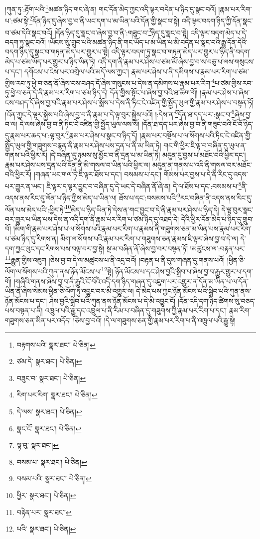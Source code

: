 །ཀུན་ཏུ་:རྟོག་པའི་\footnote{བརྟགས་པའི་  སྣར་ཐང་།  པེ་ཅིན། }མཚན་ཉིད་གང་ཞེ་ན། གང་དོན་མེད་ཀྱང་འདི་ལྟར་བདེན་པ་ཉིད་དུ་སྣང་བའོ། །རྣམ་པར་རིག་པ་:ཙམ་སྟེ་\footnote{ཙམ་དེ་  སྣར་ཐང་།  པེ་ཅིན། }དོན་ཉིད་དུ་ཞེས་བྱ་བ་ནི་ཡང་དག་པ་མ་ཡིན་པའི་དོན་གྱི་སྣང་བ་སྟེ། འདི་ལྟར་བདག་ཉིད་ཀྱི་དོན་སྣང་བ་ཙམ་དེའི་སྣང་བའོ། །དོན་ཉིད་དུ་སྣང་བ་ཞེས་བྱ་བ་ནི་:གཟུང་བ་\footnote{བཟུང་བ་  སྣར་ཐང་།  པེ་ཅིན། }ཉིད་དུ་སྣང་བ་སྟེ། འདི་ལྟར་བདག་མེད་པ་དེ་བདག་ཏུ་སྣང་བའོ། །ཡོངས་སུ་གྲུབ་པའི་མཚན་ཉིད་ནི་གང་ཡོད་པ་མ་ཡིན་པ་མི་བདེན་པ་སྣང་བའི་རྒྱུ་དོན་དེའི་བདག་ཉིད་དུ་སྣང་བ་གཏན་མེད་པར་གྱུར་པ་སྟེ། འདི་ལྟར་བདག་ཏུ་སྣང་བ་གཏན་མེད་པར་གྱུར་པ་ཉིད་ནི་བདག་མེད་པ་ཙམ་ཡོད་པར་གྱུར་པ་ཉིད་ཡིན་ཏེ། འདི་དག་ནི་རྣམ་པར་ཤེས་པ་ཙམ་མོ་ཞེས་བྱ་བ་ས་བཅུ་པ་ལས་གསུངས་པ་དང་། དགོངས་པ་ངེས་པར་འགྲེལ་པའི་མདོ་ལས་ཀྱང་། རྣམ་པར་ཤེས་པ་ནི་དམིགས་པ་རྣམ་པར་རིག་པ་ཙམ་གྱིས་རབ་ཏུ་ཕྱེ་བ་ཅན་ནོ་ཞེས་ངས་བཤད་དོ་ཞེས་གསུངས་པ་དེས་ན་དམིགས་པ་རྣམ་པར་རིག་\footnote{རིག་པར་རིག་  སྣར་ཐང་།  པེ་ཅིན། }པ་ཙམ་གྱིས་རབ་ཏུ་ཕྱེ་བ་ཅན་དེ་ནི་རྣམ་པར་རིག་པ་ཙམ་ཉིད་དེ། དོན་གྱིས་སྟོང་པ་ཞེས་བྱ་བའི་ཐ་ཚིག་གོ། །རྣམ་པར་ཤེས་པ་ཞེས་ངས་བཤད་དོ་ཞེས་བྱ་བའི་རྣམ་པར་ཤེས་པ་སྨོས་པ་དེས་ནི་ཏིང་ངེ་འཛིན་གྱི་སྤྱོད་ཡུལ་གྱི་རྣམ་པར་ཤེས་པ་བསྟན་ཏོ། །འོན་ཀྱང་དེ་ལྟར་སྐྱེས་པའི་ཞེས་བྱ་བ་ནི་རྣམ་པ་དེ་ལྟ་བུར་སྐྱེས་པའོ། །:དེས་ན་\footnote{དེ་ལས་  སྣར་ཐང་།  པེ་ཅིན། }དོན་ཐ་དད་པར་:སྣང་བ་\footnote{སྣང་ངོ་  སྣར་ཐང་།  པེ་ཅིན། }ཞེས་བྱ་བ་ལ། དེ་ལས་ཞེས་བྱ་བ་ནི་ཏིང་ངེ་འཛིན་གྱི་སྤྱོད་ཡུལ་ལས་སོ། །དོན་ཐ་དད་པར་ཞེས་བྱ་བ་ནི་གཟུང་བའི་ངོ་བོ་ཉིད་དུ་རྣམ་པར་ཆད་པ་:ལྟ་བུར་\footnote{ལྟ་བུ་  སྣར་ཐང་། }རྣམ་པར་ཤེས་པ་སྣང་བ་ཉིད་དོ། །རྣམ་པར་བསྔོས་པ་ལ་སོགས་པའི་ཏིང་ངེ་འཛིན་གྱི་སྤྱོད་ཡུལ་གྱི་གཟུགས་བརྙན་ནི་རྣམ་པར་ཤེས་པས་དྲན་པ་ནི་མ་ཡིན་ཏེ། གང་གི་ཕྱིར་ཇི་ལྟ་བ་བཞིན་དུ་ཡུལ་ན་གནས་པའི་ཕྱིར་རོ། །དེ་བཞིན་དུ་ཉམས་སུ་མྱོང་བ་ནི་དྲན་པ་མ་ཡིན་ཏེ། མདུན་དུ་བྱས་པ་མཐོང་བའི་ཕྱིར་དང་། རྣམ་པར་ཤེས་པས་དྲན་པའི་དོན་ནི་མི་གསལ་བ་ཡིན་པའི་ཕྱིར་ལ། མདུན་ན་གནས་པ་འདི་ནི་གསལ་བར་མཐོང་བའི་ཕྱིར་རོ། །གཞན་ཡང་གལ་ཏེ་ཇི་ལྟར་ཐོས་པ་དང་། བསམས་པ་དང་། གོམས་པར་བྱས་པ་དེ་ནི་རིང་དུ་འདས་པར་གྱུར་ན་ཡང་། ཇི་ལྟར་ད་ལྟར་བྱུང་བ་བཞིན་དུ་དེ་ཡང་དེ་བཞིན་ནོ་ཞེ་ན། དེ་ལ་ཐོས་པ་དང་:བསམས་པ་\footnote{བསམ་པ་  སྣར་ཐང་།  པེ་ཅིན། }ནི་འདས་ནས་རིང་དུ་ལོན་པ་ཉིད་ཀྱིས་མེད་པ་ཡིན་ལ། ཐོས་པ་དང་:བསམས་པའི་\footnote{བསམ་པའི་  སྣར་ཐང་།  པེ་ཅིན། }རང་བཞིན་ནི་འདས་ནས་རིང་དུ་ལོན་པས་མེད་པའི་:ཕྱིར་ཏེ་\footnote{ཕྱིར་  སྣར་ཐང་།  པེ་ཅིན། }མེད་པ་ཉིད་ཡིན་ཏེ་དེས་ན་གང་བྱུང་བ་དེ་ནི་རྣམ་པར་ཤེས་པ་ཉིད་དེ། དེ་ལྟ་བུར་སྣང་བར་གྱུར་པ་ཡིན་པས་དེས་ན་འདི་དག་ནི་རྣམ་པར་རིག་པ་ཙམ་ཉིད་དུ་འཐད་དེ། དེའི་ཕྱིར་དོན་མེད་པ་ཉིད་དུ་གྲུབ་བོ། །མིག་གི་རྣམ་པར་ཤེས་པ་ལ་སོགས་པའི་རྣམ་པར་རིག་པ་རྣམས་ནི་གཟུགས་ཅན་མ་ཡིན་པས་རྣམ་པར་རིག་པ་ཙམ་ཉིད་དུ་རིགས་ན། མིག་ལ་སོགས་པའི་རྣམ་པར་རིག་པ་གཟུགས་ཅན་རྣམས་ཇི་ལྟར་ཞེས་བྱ་བ་དེ་ལ། དེ་དག་ཀྱང་ལུང་དང་རིགས་པས་བལྟ་བར་བྱ་སྟེ། སྔ་མ་བཞིན་ནོ་ཞེས་བྱ་བར་བསྟན་ཏོ། །མཚུངས་ལ་:བརྟན་པར་\footnote{བརྟེན་པར་  སྣར་ཐང་། }རྒྱུན་གྱིས་འཇུག །ཅེས་བྱ་བ་དེ་ལ་མཚུངས་པ་ནི་འདྲ་བའོ། །བརྟན་པ་ནི་དུས་གཞན་དུ་གནས་པའོ། །ཕྱིན་ཅི་ལོག་ལ་སོགས་པའི་ཀུན་ནས་ཉོན་མོངས་པ་\footnote{པའི་  སྣར་ཐང་།  པེ་ཅིན། }སྟེ། ཉོན་མོངས་པ་དང་ཤེས་བྱའི་སྒྲིབ་པ་ཞེས་བྱ་བ་རྒྱུར་གྱུར་པ་དག་གོ། །གཞིའི་གནས་ཞེས་བྱ་བ་ནི་རྒྱུའི་ངོ་བོའི་འདི་དག་ཉིད་གཞན་དུ་འཇུག་པར་འགྱུར་ན་དོན་མ་ཡིན་པ་ལ་དོན་ཡིན་ནོ་ཞེས་སེམས་ཕྱིན་ཅི་ལོག་ཏུ་འབྱུང་བར་མི་འགྱུར་ལ། དེ་མེད་པས་ཀྱང་ཉོན་མོངས་པའི་སྒྲིབ་པའི་ཀུན་ནས་ཉོན་མོངས་པ་དང་། ཤེས་བྱའི་སྒྲིབ་པའི་ཀུན་ནས་ཉོན་མོངས་པ་དེ་མི་འབྱུང་ངོ། །དོན་འདི་དག་ཉིད་ཚིགས་སུ་བཅད་པས་བསྟན་པ་ནི། འཁྲུལ་པའི་རྒྱུ་དང་འཁྲུལ་པ་ནི་རིམ་པ་བཞིན་དུ་གཟུགས་ཀྱི་རྣམ་པར་རིག་པ་དང་། རྣམ་རིག་གཟུགས་ཅན་མིན་པར་འདོད། །ཅེས་བྱ་བའོ། །དེ་ལ་གཟུགས་ཅན་གྱི་རྣམ་པར་རིག་པ་ནི་འཁྲུལ་པའི་རྒྱུ་སྟེ། 